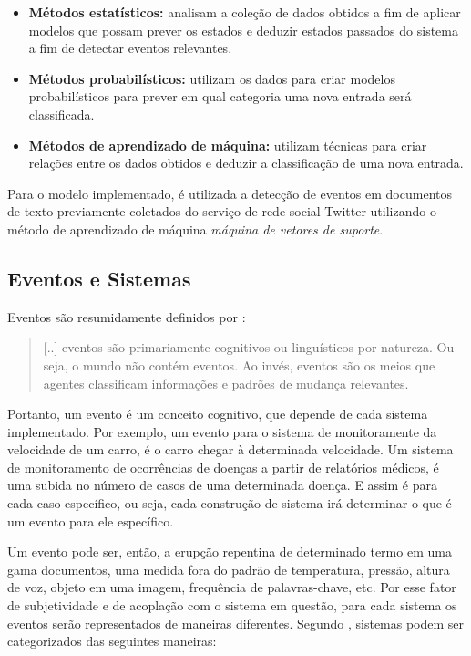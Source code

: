 \begin{itemize}
	\item \textbf{Métodos estatísticos:} analisam a coleção de dados obtidos a fim de aplicar modelos que possam prever os estados e deduzir estados passados do sistema a fim de detectar eventos relevantes. 
	\item \textbf{Métodos probabilísticos:} utilizam os dados para criar modelos probabilísticos para prever em qual categoria uma nova entrada será classificada. 
	\item \textbf{Métodos de aprendizado de máquina:} utilizam técnicas para criar relações entre os dados obtidos e deduzir a classificação de uma nova entrada.
\end{itemize}

Para o modelo implementado, é utilizada a detecção de eventos em documentos de texto previamente coletados do serviço de rede social Twitter utilizando o método de aprendizado de máquina \textit{máquina de vetores de suporte}. 

\subsection{Eventos e Sistemas}

Eventos são resumidamente definidos por :

\begin{quote}
[..] eventos são primariamente cognitivos ou linguísticos por natureza. Ou seja, o mundo não contém eventos. Ao invés, eventos são os meios que agentes classificam informações e padrões de mudança relevantes.
\end{quote}

Portanto, um evento é um conceito cognitivo, que depende de cada sistema implementado. Por exemplo, um evento para o sistema de monitoramente da velocidade de um carro, é o carro chegar à determinada velocidade. Um sistema de monitoramento de ocorrências de doenças a partir de relatórios médicos, é uma subida no número de casos de uma determinada doença. E assim é para cada caso específico, ou seja, cada construção de sistema irá determinar o que é um evento para ele específico. 

Um evento pode ser, então, a erupção repentina de determinado termo em uma gama documentos, uma medida fora do padrão de temperatura, pressão, altura de voz, objeto em uma imagem, frequência de palavras-chave, etc. Por esse fator de subjetividade e de acoplação com o sistema em questão, para cada sistema os eventos serão representados de maneiras diferentes. Segundo , sistemas podem ser categorizados das seguintes maneiras:

